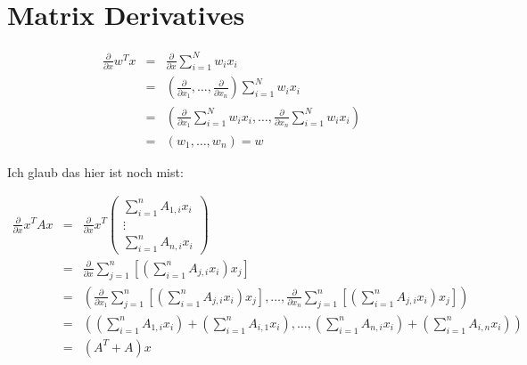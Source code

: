\section*{Matrix Derivatives}


\begin{eqnarray}
    \frac{\partial}{\partial x}w^Tx&=& \frac{\partial}{\partial x} \sum_{i=1}^N w_i x_i  \\
    &=&\left(\frac{\partial}{\partial x_1}, \dots, \frac{\partial}{\partial x_n} \right) \sum_{i=1}^N w_i x_i \\
    &=&\left(\frac{\partial}{\partial x_1}\sum_{i=1}^N w_i x_i , \dots, \frac{\partial}{\partial x_n} \sum_{i=1}^N w_i x_i \right) \\
    &=& (w_1,\dots,w_n) = w
\end{eqnarray}


Ich glaub das hier ist noch mist:

\begin{eqnarray}
    \frac{\partial}{\partial x}x^TAx&=& \frac{\partial}{\partial x} x^T \left( 
    \begin{matrix}
      \sum_{i=1}^n A_{1,i} x_i\\ 
      \vdots \\
      \sum_{i=1}^n A_{n,i} x_i 
    \end{matrix}\right) \\
    &=& \frac{\partial}{\partial x} \sum_{j=1}^n\left[ \left( \sum_{i=1}^nA_{j,i}x_i \right) x_j \right]\\
    &=& \left( \frac{\partial}{\partial x_1} \sum_{j=1}^n\left[ \left( \sum_{i=1}^nA_{j,i}x_i \right) x_j \right], \dots , 
    \frac{\partial}{\partial x_n} \sum_{j=1}^n\left[ \left( \sum_{i=1}^nA_{j,i}x_i \right) x_j \right] \right) \\
    &=&  \left( \left( \sum_{i=1}^n A_{1,i} x_i \right) + \left( \sum_{i=1}^n A_{i,1}x_i \right), \dots , \left( \sum_{i=1}^n A_{n,i} x_i \right) + \left( \sum_{i=1}^n A_{i,n}x_i \right) \right) \\
&=& \left ( A^T + A \right) x
\end{eqnarray}

